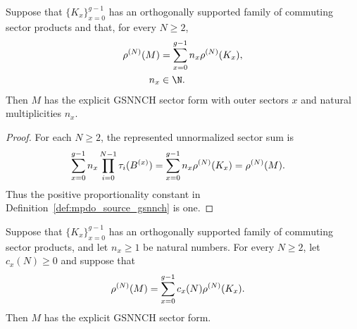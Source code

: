 \begin{lemma}
    \label{thm:mpdo_orthogonal_commuting_sectors_gsnnch}
    \leanok
    Suppose that $\{K_x\}_{x=0}^{g-1}$ has an orthogonally supported family
    of commuting sector products and that, for every $N\geq2$,
    \begin{align}
        \rho^{(N)}(M)
            & =\sum_{x=0}^{g-1}n_x\rho^{(N)}(K_x),
        \notag                                     \\
        n_x & \in\N.
        \notag
    \end{align}
    Then $M$ has the explicit GSNNCH sector form with outer sectors $x$ and
    natural multiplicities $n_x$.
\end{lemma}

\begin{proof}\leanok
    For each $N\geq2$, the represented unnormalized sector sum is
    \begin{align}
        \sum_{x=0}^{g-1}n_x
        \prod_{i=0}^{N-1}\tau_i(B^{(x)})
         & =\sum_{x=0}^{g-1}n_x\rho^{(N)}(K_x)
        =\rho^{(N)}(M).
        \notag
    \end{align}
    Thus the positive proportionality constant in
    Definition~\ref{def:mpdo_source_gsnnch} is one.
\end{proof}

\begin{lemma}
    \label{thm:mpdo_nonnegative_orthogonal_commuting_sectors_gsnnch}
    \leanok
    Suppose that $\{K_x\}_{x=0}^{g-1}$ has an orthogonally supported family
    of commuting sector products, and let $n_x\geq1$ be natural numbers.
    For every $N\geq2$, let $c_x(N)\geq0$ and suppose that
    \begin{align}
        \rho^{(N)}(M)
         & =\sum_{x=0}^{g-1}c_x(N)\rho^{(N)}(K_x).
        \notag
    \end{align}
    Then $M$ has the explicit GSNNCH sector form.
\end{lemma}


